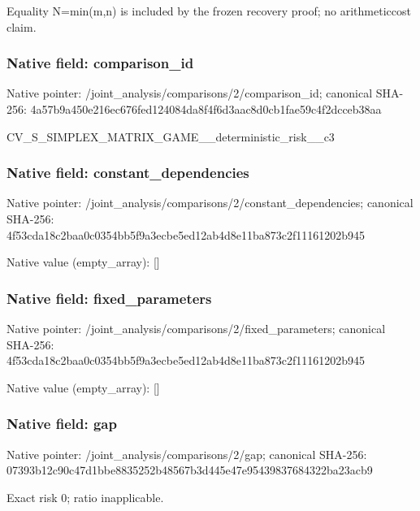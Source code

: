 \documentclass[10pt,a4paper]{article}
\begin{document}
Equality N=min(m,n) is included by the frozen recovery proof; no arithmeticcost claim.


\subsubsection{Native field: comparison\_id}


Native pointer: /joint\_analysis/comparis\allowbreak{}ons/2/comparison\_id; canonical SHA-256: 4a57b9a450e216ec676fed12\allowbreak{}4084da8f4f6d3aac8d0cb1fa\allowbreak{}e59c4f2dcceb38aa


CV\_S\_SIMPLEX\_MATRIX\_GAME\allowbreak{}\_\_deterministic\_risk\_\_c3


\subsubsection{Native field: constant\_dependencies}


Native pointer: /joint\_analysis/comparis\allowbreak{}ons/2/constant\_dependenc\allowbreak{}ies; canonical SHA-256: 4f53cda18c2baa0c0354bb5f\allowbreak{}9a3ecbe5ed12ab4d8e11ba87\allowbreak{}3c2f11161202b945



Native value (empty\_array): []



\subsubsection{Native field: fixed\_parameters}


Native pointer: /joint\_analysis/comparis\allowbreak{}ons/2/fixed\_parameters; canonical SHA-256: 4f53cda18c2baa0c0354bb5f\allowbreak{}9a3ecbe5ed12ab4d8e11ba87\allowbreak{}3c2f11161202b945



Native value (empty\_array): []



\subsubsection{Native field: gap}


Native pointer: /joint\_analysis/comparisons/2/gap; canonical SHA-256: 07393b12c90c47d1bbe88352\allowbreak{}52b48567b3d445e47e954398\allowbreak{}37684322ba23acb9


Exact risk 0; ratio inapplicable.
\end{document}
